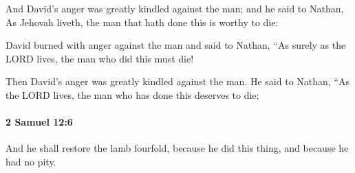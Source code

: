 			\begin{versebox}
					\item[BHS] 
					\item[ASV] And David's anger was greatly kindled against the man; and he said to Nathan, As Jehovah liveth, the man that hath done this is worthy to die:
					\item[NIV] David burned with anger against the man and said to Nathan, “As surely as the LORD lives, the man who did this must die!
					\item[NRSV] Then David’s anger was greatly kindled against the man. He said to Nathan, “As the LORD lives, the man who has done this deserves to die;
			\end{versebox}

		\paragraph{2 Samuel 12:6} %
			\label{2SAMUEL-12-6}

			And he shall restore the lamb fourfold, because he did this thing, and because he had no pity.

